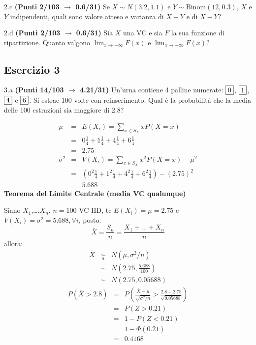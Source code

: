 \documentclass[
  11pt,
]{book}
\theoremstyle{mytheoremstyle}
\theoremstyle{mydefstyle}
\newenvironment{sol}
  {
  \begin{tcolorbox}[enhanced,breakable,arc=0.1mm,boxrule=1pt,colback=white,colframe=iblue,
  title=\bf \fontfamily{lmss}\selectfont \hspace{.5 cm} Soluzione,drop fuzzy shadow]

}{
\end{tcolorbox}
  }
\begin{document}
2.c \textbf{(Punti 2/103 \(\rightarrow\) 0.6/31)} Se \(X\sim N(3.2,1.1)\) e \(Y\sim\text{Binom}(12,0.3)\), \(X\) e \(Y\) indipendenti, quali sono valore atteso e varianza di \(X+Y\) e di \(X-Y\)?

2.d \textbf{(Punti 2/103 \(\rightarrow\) 0.6/31)} Sia \(X\) una VC e sia \(F\) la sua funzione di ripartizione. Quanto valgono \(\lim_{x\to-\infty}F(x)\) e \(\lim_{x\to+\infty}F(x)\)?

\subsection{Esercizio 3}\label{esercizio-3-20}

3.a \textbf{(Punti 14/103 \(\rightarrow\) 4.21/31)} Un'urna contiene 4 palline numerate: \(\fbox{0}\), \(\fbox{1}\), \(\fbox{4}\) e \(\fbox{6}\). Si estrae 100 volte con reinserimento. Qual è la probabilità che la media delle 100 estrazioni sia maggiore di 2.8?

\begin{sol}
\begin{eqnarray*} \mu &=& E(X_i) = \sum_{x\in S_X}x P(X=x)\\ 
 &=&  0  \frac { 1 }{ 4 }+ 1  \frac { 1 }{ 4 }+ 4  \frac { 1 }{ 4 }+ 6  \frac { 1 }{ 4 } \\ 
            &=& 2.75 \\ 
 \sigma^2 &=& V(X_i) = \sum_{x\in S_X}x^2 P(X=x)-\mu^2\\ 
 &=&\left(  0  ^2\frac { 1 }{ 4 }+ 1  ^2\frac { 1 }{ 4 }+ 4  ^2\frac { 1 }{ 4 }+ 6  ^2\frac { 1 }{ 4 } \right)-( 2.75 )^2\\ 
            &=& 5.688 
\end{eqnarray*}
\textbf{Teorema del Limite Centrale (media VC qualunque)}

Siano \(X_1\),\ldots,\(X_n\), \(n=100\) VC IID, tc \(E(X_i)=\mu=2.75\) e \(V(X_i)=\sigma^2=5.688,\forall i\), posto:
\[
      \bar X=\frac{S_n}n =\frac{X_1 + ... + X_n}n
      \]
allora:\begin{eqnarray*}
  \bar X & \mathop{\sim}\limits_{a}& N(\mu,\sigma^2/n) \\
     &\sim & N\left(2.75,\frac{5.688}{100}\right) \\
     &\sim & N(2.75,0.05688)
  \end{eqnarray*}\begin{eqnarray*}
      P( \bar X   >   2.8 ) 
        &=& P\left(  \frac { \bar X  -  \mu }{ \sqrt{\sigma^2/n} }  >  \frac { 2.8  -  2.75 }{\sqrt{ 0.05688 }} \right)  \\
                 &=& P\left(  Z   >   0.21 \right) \\    &=& 1-P(Z< 0.21 )\\ 
                 &=&  1-\Phi( 0.21 ) \\ &=&  0.4168 
      \end{eqnarray*}

\end{sol}
\end{document}
